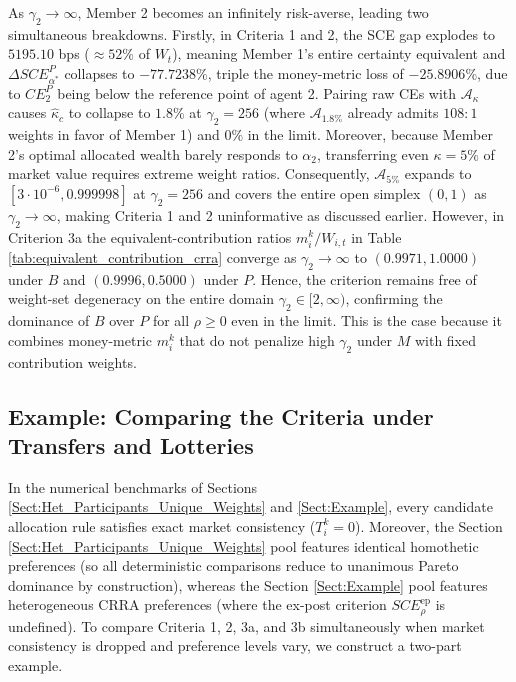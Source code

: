 \documentclass[11pt,a4paper]{article}
\theoremstyle{definition}
\theoremstyle{plain}
\theoremstyle{remark}
\newcommand{\1}{\mathbf{1}}
\begin{document}
\begin{itemize}
    As $\gamma_2 \to \infty$, Member 2 becomes an infinitely risk-averse, leading two simultaneous breakdowns. Firstly, in Criteria 1 and 2, the SCE gap explodes to $5195.10$ bps ($\approx 52\%$ of $W_t$), meaning Member 1's entire certainty equivalent and $\Delta SCE_{\alpha^*}^P$ collapses to $-77.7238\%$, triple the money-metric loss of $-25.8906\%$, due to $CE_2^P$ being below the reference point of agent 2. Pairing raw CEs with $\mathcal{A}_\kappa$ causes $\hat{\kappa}_c$ to collapse to $1.8\%$ at $\gamma_2 = 256$ (where $\mathcal{A}_{1.8\%}$ already admits $108:1$ weights in favor of Member 1) and $0\%$ in the limit. Moreover, because Member 2's optimal allocated wealth barely responds to $\alpha_2$, transferring even $\kappa = 5\%$ of market value requires extreme weight ratios. Consequently, $\mathcal{A}_{5\%}$ expands to $[3 \cdot 10^{-6}, 0.999998]$ at $\gamma_2 = 256$ and covers the entire open simplex $(0,1)$ as $\gamma_2 \to \infty$, making Criteria 1 and 2 uninformative as discussed earlier. However, in Criterion 3a the equivalent-contribution ratios $m_i^k / W_{i,t}$ in Table \ref{tab:equivalent_contribution_crra} converge as $\gamma_2 \to \infty$ to $(0.9971, 1.0000)$ under $B$ and $(0.9996, 0.5000)$ under $P$. Hence, the criterion remains free of weight-set degeneracy on the entire domain $\gamma_2 \in [2, \infty)$, confirming the dominance of $B$ over $P$ for all $\rho \geq 0$ even in the limit. This is the case because it combines money-metric $m_i^k$ that do not penalize high $\gamma_2$ under $M$ with fixed contribution weights.
\end{itemize}

\subsection{Example: Comparing the Criteria under Transfers and Lotteries}
\label{Subsect:Example_Synthesis}

In the numerical benchmarks of Sections \ref{Sect:Het_Participants_Unique_Weights} and \ref{Sect:Example}, every candidate allocation rule satisfies exact market consistency ($T_i^k = 0$). Moreover, the Section \ref{Sect:Het_Participants_Unique_Weights} pool features identical homothetic preferences (so all deterministic comparisons reduce to unanimous Pareto dominance by construction), whereas the Section \ref{Sect:Example} pool features heterogeneous CRRA preferences (where the ex-post criterion $SCE_\rho^{\text{ep}}$ is undefined). To compare Criteria 1, 2, 3a, and 3b simultaneously when market consistency is dropped and preference levels vary, we construct a two-part example.
\end{document}
